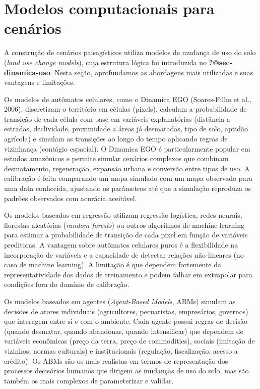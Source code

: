 \documentclass[
  portuguese,
  11pt,
  a4paper,
  open=any]{scrbook}
\begin{document}
\section{Modelos computacionais para
cenários}\label{modelos-computacionais-para-cenuxe1rios}

A construção de cenários paisagísticos utiliza modelos de mudança de uso
do solo (\emph{land use change models}), cuja estrutura lógica foi
introduzida no \textbf{?@sec-dinamica-uso}. Nesta seção, aprofundamos as
abordagens mais utilizadas e suas vantagens e limitações.

Os modelos de autômatos celulares, como o Dinamica EGO (Soares-Filho et
al., 2006), discretizam o território em células (pixels), calculam a
probabilidade de transição de cada célula com base em variáveis
explanatórias (distância a estradas, declividade, proximidade a áreas já
desmatadas, tipo de solo, aptidão agrícola) e simulam as transições ao
longo do tempo aplicando regras de vizinhança (contágio espacial). O
Dinamica EGO é particularmente popular em estudos amazônicos e permite
simular cenários complexos que combinam desmatamento, regeneração,
expansão urbana e conversão entre tipos de uso. A calibração é feita
comparando um mapa simulado com um mapa observado para uma data
conhecida, ajustando os parâmetros até que a simulação reproduza os
padrões observados com acurácia aceitável.

Os modelos baseados em regressão utilizam regressão logística, redes
neurais, florestas aleatórias (\emph{random forests}) ou outros
algoritmos de machine learning para estimar a probabilidade de transição
de cada pixel em função de variáveis preditoras. A vantagem sobre
autômatos celulares puros é a flexibilidade na incorporação de variáveis
e a capacidade de detectar relações não-lineares (no caso de machine
learning). A limitação é que dependem fortemente da representatividade
dos dados de treinamento e podem falhar em extrapolar para condições
fora do domínio de calibração.

Os modelos baseados em agentes (\emph{Agent-Based Models}, ABMs) simulam
as decisões de atores individuais (agricultores, pecuaristas,
empresários, governos) que interagem entre si e com o ambiente. Cada
agente possui regras de decisão (quando desmatar, quando abandonar,
quando intensificar) que dependem de variáveis econômicas (preço da
terra, preço de commodities), sociais (imitação de vizinhos, normas
culturais) e institucionais (regulação, fiscalização, acesso a crédito).
Os ABMs são os mais realistas em termos de representação dos processos
decisórios humanos que dirigem as mudanças de uso do solo, mas são
também os mais complexos de parameterizar e validar.
\end{document}
